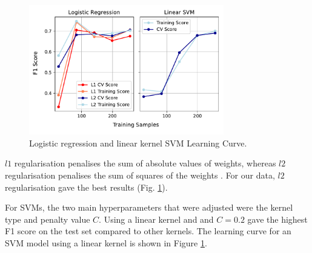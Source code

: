 \begin{figure}[h]
\includegraphics[width=8.5cm]{plots/learningcurves.pdf}
\caption{Logistic regression and linear kernel SVM Learning Curve.}
\label{fig:learningcurve}
\centering
\end{figure}

$l1$ regularisation penalises the sum of absolute values of weights, whereas $l2$ regularisation penalises the sum of squares of the weights \cite{ahmadian1998regularisation}. For our data, $l2$ regularisation gave the best results (Fig. \ref{fig:learningcurve}).

For SVMs, the two main hyperparameters that were adjusted were the kernel type and penalty value $C$. Using a linear kernel and and $C=0.2$ gave the highest F1 score on the test set compared to other kernels. The learning curve for an SVM model using a linear kernel is shown in Figure \ref{fig:learningcurve}.


